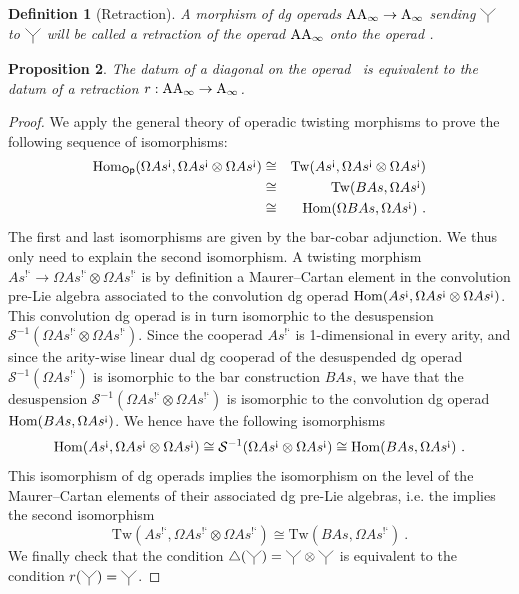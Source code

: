 \documentclass[twoside, 12pt]{amsart}
\newtheorem{definition}{Definition}[section]
\newtheorem{proposition}[definition]{Proposition}
\theoremstyle{remark}
\begin{document}
\begin{definition}[Retraction]
A morphism of dg operads $\mathrm{AA}_\infty \rightarrow \mathrm{A}_\infty$ sending $\premiertermecobarbarA$ to $\premiertermecobarbarA$ will be called a \emph{retraction of the operad $\mathrm{AA}_\infty$ onto the operad \Ainf }.
\end{definition}

\begin{proposition}\label{prop:retract}
The datum of a diagonal on the operad \Ainf\ is equivalent to the datum of a retraction $r : \mathrm{AA}_\infty \rightarrow \mathrm{A}_\infty$.
\end{proposition}

\begin{proof}
We apply the general theory of operadic twisting morphisms \cite[Section 6.4]{LodayVallette12} to prove the following sequence of isomorphisms: 
\begin{eqnarray*}
  \mathrm{Hom}_{\mathsf{Op}} (\Omega As^{\text{!`}}, \Omega As^{\text{!`}} \otimes \Omega As^{\text{!`}}) & \cong & \mathrm{Tw}(As^{\text{!`}}, \Omega As^{\text{!`}} \otimes \Omega As^{\text{!`}}) \\
  & \cong & \mathrm{Tw}(B As,\Omega As^{\text{!`}}) \\
  & \cong & \mathrm{Hom} (\Omega B As, \Omega As^{\text{!`}}) \ . 
\end{eqnarray*}
The first and last isomorphisms are given by the bar-cobar adjunction. We thus only need to explain the second isomorphism. 
A twisting morphism $As^{\text{!`}}\to \Omega As^{\text{!`}} \otimes \Omega As^{\text{!`}}$ is by definition a Maurer--Cartan element in the convolution pre-Lie algebra associated to the convolution dg operad $\mathrm{Hom} (As^{\text{!`}}, \Omega As^{\text{!`}} \otimes \Omega As^{\text{!`}})$.
This convolution dg operad is in turn isomorphic to the desuspension $\mathcal{S}^{-1}(\Omega As^{\text{!`}} \otimes \Omega As^{\text{!`}})$.
Since the cooperad $As^{\text{!`}}$ is 1-dimensional in every arity, and since the arity-wise linear dual dg cooperad of the desuspended dg operad $\mathcal{S}^{-1}(\Omega As^{\text{!`}})$ is isomorphic to the bar construction $B As$, we have that 
the desuspension $\mathcal{S}^{-1}(\Omega As^{\text{!`}} \otimes \Omega As^{\text{!`}})$ is isomorphic to the convolution dg operad $\mathrm{Hom} (B As, \Omega As^{\text{!`}})$. We hence have the following isomorphisms
\[ \mathrm{Hom} (As^{\text{!`}}, \Omega As^{\text{!`}} \otimes \Omega As^{\text{!`}}) \cong \mathcal{S}^{-1}(\Omega As^{\text{!`}} \otimes \Omega As^{\text{!`}}) \cong \mathrm{Hom} (B As, \Omega As^{\text{!`}}) \ . \]
This isomorphism of dg operads implies the isomorphism on the level of the Maurer--Cartan elements of their associated dg pre-Lie algebras, i.e. the implies the second isomorphism
\[ \mathrm{Tw}(As^{\text{!`}}, \Omega As^{\text{!`}} \otimes \Omega As^{\text{!`}}) \cong \mathrm{Tw}(B As,\Omega As^{\text{!`}}) \ . \]
We finally check that the condition $\triangle (\premiertermecobarbarA) = \premiertermecobarbarA \otimes \premiertermecobarbarA$ is equivalent to the condition $r(\premiertermecobarbarA)=\premiertermecobarbarA$.
\end{proof}
\end{document}
